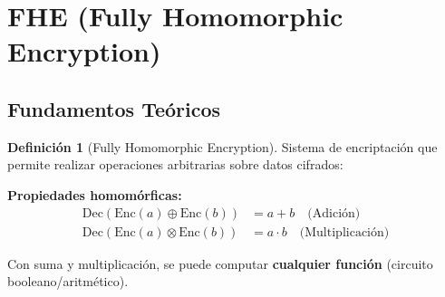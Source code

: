\documentclass[11pt,a4paper,twoside]{book}
\theoremstyle{definition}
\newtheorem{definition}{Definición}[chapter]
\theoremstyle{remark}
\begin{document}
\section{FHE (Fully Homomorphic Encryption)}
\label{sec:fhe}

\subsection{Fundamentos Teóricos}

\begin{definition}[Fully Homomorphic Encryption]
Sistema de encriptación que permite realizar operaciones arbitrarias sobre datos cifrados:

\textbf{Propiedades homomórficas:}
\begin{align}
\text{Dec}(\text{Enc}(a) \oplus \text{Enc}(b)) &= a + b \quad \text{(Adición)} \\
\text{Dec}(\text{Enc}(a) \otimes \text{Enc}(b)) &= a \cdot b \quad \text{(Multiplicación)}
\end{align}

Con suma y multiplicación, se puede computar \textbf{cualquier función} (circuito booleano/aritmético).
\end{definition}
\end{document}
